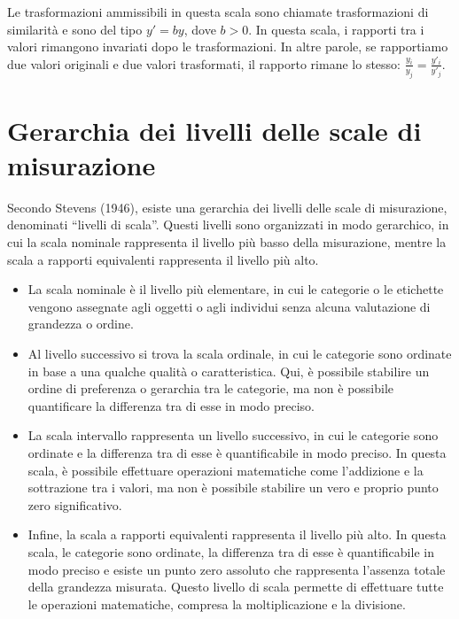 \documentclass[
  letterpaper,
  krantz2]{{[}./krantz{]}}
\providecommand{\tightlist}{%
  \setlength{\itemsep}{0pt}\setlength{\parskip}{0pt}}\usepackage{longtable,booktabs,array}
\begin{document}
Le trasformazioni ammissibili in questa scala sono chiamate
trasformazioni di similarità e sono del tipo \(y' = by\), dove \(b>0\).
In questa scala, i rapporti tra i valori rimangono invariati dopo le
trasformazioni. In altre parole, se rapportiamo due valori originali e
due valori trasformati, il rapporto rimane lo stesso:
\(\frac{y_i}{y_j} = \frac{y'_i}{y'_j}\).

\section{Gerarchia dei livelli delle scale di
misurazione}\label{gerarchia-dei-livelli-delle-scale-di-misurazione}

Secondo Stevens (1946), esiste una gerarchia dei livelli delle scale di
misurazione, denominati ``livelli di scala''. Questi livelli sono
organizzati in modo gerarchico, in cui la scala nominale rappresenta il
livello più basso della misurazione, mentre la scala a rapporti
equivalenti rappresenta il livello più alto.

\begin{itemize}
\tightlist
\item
  La scala nominale è il livello più elementare, in cui le categorie o
  le etichette vengono assegnate agli oggetti o agli individui senza
  alcuna valutazione di grandezza o ordine.
\item
  Al livello successivo si trova la scala ordinale, in cui le categorie
  sono ordinate in base a una qualche qualità o caratteristica. Qui, è
  possibile stabilire un ordine di preferenza o gerarchia tra le
  categorie, ma non è possibile quantificare la differenza tra di esse
  in modo preciso.
\item
  La scala intervallo rappresenta un livello successivo, in cui le
  categorie sono ordinate e la differenza tra di esse è quantificabile
  in modo preciso. In questa scala, è possibile effettuare operazioni
  matematiche come l'addizione e la sottrazione tra i valori, ma non è
  possibile stabilire un vero e proprio punto zero significativo.
\item
  Infine, la scala a rapporti equivalenti rappresenta il livello più
  alto. In questa scala, le categorie sono ordinate, la differenza tra
  di esse è quantificabile in modo preciso e esiste un punto zero
  assoluto che rappresenta l'assenza totale della grandezza misurata.
  Questo livello di scala permette di effettuare tutte le operazioni
  matematiche, compresa la moltiplicazione e la divisione.
\end{itemize}
\end{document}
